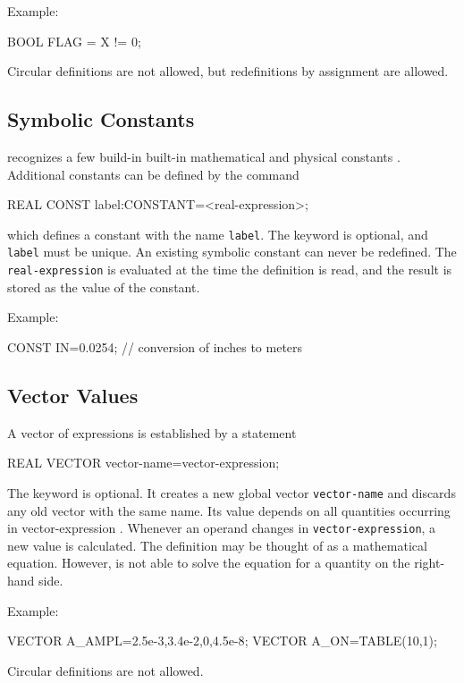 \noindent Example:
\begin{example}
BOOL FLAG = X != 0;
\end{example}
Circular definitions are not allowed, but redefinitions by assignment
are allowed.

\subsection{Symbolic Constants}
\label{sec:constant}
\opal recognizes a few build-in built-in mathematical and physical
constants .
Additional constants can be defined by the command
\begin{example}
REAL CONST label:CONSTANT=<real-expression>;
\end{example}
which defines a constant with the name \texttt{label}.
The keyword  is optional, and \texttt{label} must be unique.
An existing symbolic constant can never be redefined.
The \texttt{real-expression} is evaluated at the time the
 definition is read, and the result is stored as the
value of the constant.

\noindent Example:
\begin{example}
CONST IN=0.0254; // conversion of inches to meters
\end{example}

\subsection{Vector Values}
\label{sec:vector}
A vector of expressions is established by a statement
\begin{example}
REAL VECTOR vector-name=vector-expression;
\end{example}
The keyword  is optional.
It creates a new global vector \texttt{vector-name}
and discards any old vector with the same name.
Its value depends on all quantities occurring in
{vector-expression} .
Whenever an operand changes in \texttt{vector-expression},
a new value is calculated.
The definition may be thought of as a mathematical equation.
However, \opal is not able to solve the equation for a quantity on the
right-hand side.

\noindent Example:
\begin{example}
VECTOR A_AMPL={2.5e-3,3.4e-2,0,4.5e-8};
VECTOR A_ON=TABLE(10,1);
\end{example}
Circular definitions are not allowed.

